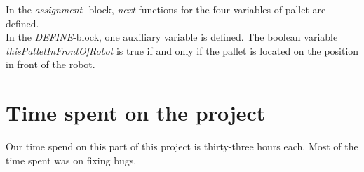 \documentclass[10pt,a4paper]{article}
\begin{document}
In the \emph{assignment}- block, \emph{next}-functions for the four variables of pallet are defined.
\\
In the \emph{DEFINE}-block, one auxiliary variable is defined. The boolean variable \emph{thisPalletInFrontOfRobot} is true if and only if the pallet is located on the position in front of the robot.


\section*{Time spent on the project}
Our time spend on this part of this project is thirty-three hours each. Most of the time spent was on fixing bugs.
\end{document}
